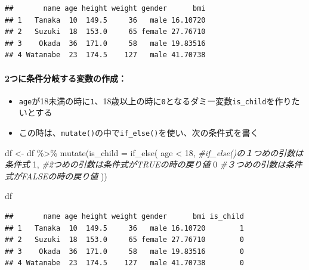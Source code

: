 \documentclass[
]{book}
\newenvironment{Shaded}{\begin{snugshade}}{\end{snugshade}}
\newcommand{\AttributeTok}[1]{\textcolor[rgb]{0.77,0.63,0.00}{#1}}
\newcommand{\CommentTok}[1]{\textcolor[rgb]{0.56,0.35,0.01}{\textit{#1}}}
\newcommand{\DecValTok}[1]{\textcolor[rgb]{0.00,0.00,0.81}{#1}}
\newcommand{\FunctionTok}[1]{\textcolor[rgb]{0.00,0.00,0.00}{#1}}
\newcommand{\NormalTok}[1]{#1}
\newcommand{\OtherTok}[1]{\textcolor[rgb]{0.56,0.35,0.01}{#1}}
\newcommand{\SpecialCharTok}[1]{\textcolor[rgb]{0.00,0.00,0.00}{#1}}
\providecommand{\tightlist}{%
  \setlength{\itemsep}{0pt}\setlength{\parskip}{0pt}}
\begin{document}
\begin{verbatim}
##       name age height weight gender      bmi
## 1   Tanaka  10  149.5     36   male 16.10720
## 2   Suzuki  18  153.0     65 female 27.76710
## 3    Okada  36  171.0     58   male 19.83516
## 4 Watanabe  23  174.5    127   male 41.70738
\end{verbatim}

\hypertarget{ux3064ux306bux6761ux4ef6ux5206ux5c90ux3059ux308bux5909ux6570ux306eux4f5cux6210}{%
\paragraph*{2つに条件分岐する変数の作成：}\label{ux3064ux306bux6761ux4ef6ux5206ux5c90ux3059ux308bux5909ux6570ux306eux4f5cux6210}}

\begin{itemize}
\tightlist
\item
  \texttt{age}が18未満の時に\texttt{1}、18歳以上の時に\texttt{0}となるダミー変数\texttt{is\_child}を作りたいとする
\item
  この時は、\texttt{mutate()}の中で\texttt{if\_else()}を使い、次の条件式を書く
\end{itemize}

\begin{Shaded}
\begin{Highlighting}[]
\NormalTok{df }\OtherTok{\textless{}{-}}\NormalTok{ df }\SpecialCharTok{\%\textgreater{}\%} 
  \FunctionTok{mutate}\NormalTok{(}\AttributeTok{is\_child =} 
           \FunctionTok{if\_else}\NormalTok{(}
\NormalTok{             age }\SpecialCharTok{\textless{}} \DecValTok{18}\NormalTok{, }\CommentTok{\#if\_else()の１つめの引数は条件式}
             \DecValTok{1}\NormalTok{, }\CommentTok{\#2つめの引数は条件式がTRUEの時の戻り値}
             \DecValTok{0} \CommentTok{\#３つめの引数は条件式がFALSEの時の戻り値}
\NormalTok{           )) }

\NormalTok{df}
\end{Highlighting}
\end{Shaded}

\begin{verbatim}
##       name age height weight gender      bmi is_child
## 1   Tanaka  10  149.5     36   male 16.10720        1
## 2   Suzuki  18  153.0     65 female 27.76710        0
## 3    Okada  36  171.0     58   male 19.83516        0
## 4 Watanabe  23  174.5    127   male 41.70738        0
\end{verbatim}
\end{document}
